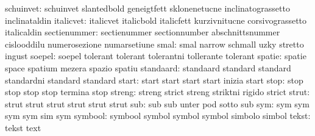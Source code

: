                 schuinvet: schuinvet                 slantedbold
                           geneigtfett               sklonenetucne
                           inclinatograssetto        inclinataldin
                italicvet: italicvet                 italicbold
                           italicfett                kurzivnitucne
                           corsivograssetto          italicaldin
             sectienummer: sectienummer              sectionnumber
                           abschnittsnummer          cislooddilu
                           numerosezione             numarsetiune
                     smal: smal                      narrow
                           schmall                   uzky
                           stretto                   ingust
                   soepel: soepel                    tolerant
                           tolerant                  tolerantni
                           tollerante                tolerant
                   spatie: spatie                    space
                           spatium                   mezera
                           spazio                    spatiu %
                standaard: standaard                 standard
                           standard                  standardni
                           standard                  standard
                    start: start                     start
                           start                     start
                           inizia                    start
                     stop: stop                      stop
                           stop                      stop
                           termina                   stop
                   streng: streng                    strict
                           streng                    striktni
                           rigido                    strict
                    strut: strut                     strut
                           strut                     strut
                           strut                     strut
                      sub: sub                       sub
                           unter                     pod
                           sotto                     sub
                      sym: sym                       sym
                           sym                       sym
                           sim                       sym
                  symbool: symbool                   symbol
                           symbol                    symbol
                           simbolo                   simbol
                    tekst: tekst                     text
